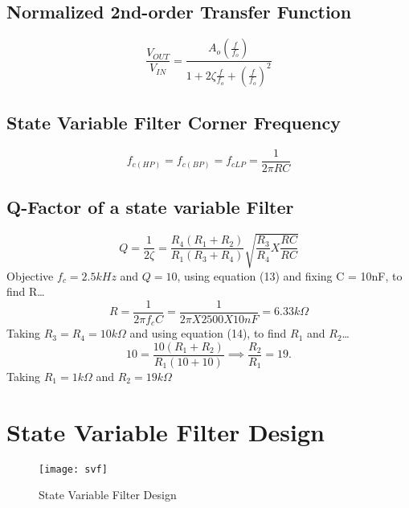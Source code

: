 \documentclass[
	letterpaper, %
	10pt, %
]{CSUniSchoolLabReport}
\begin{document}
\subsection{Normalized 2nd-order Transfer Function}
\begin{equation}
	\boxed{\frac{V_{OUT} }{V_{IN} } = \frac{A_o\left(\frac{f}{f_o}\right)}{1+2\zeta \frac{f}{f_o}+ \left(\frac{f}{f_o}\right)^2}}
\end{equation}
\subsection{State Variable Filter Corner Frequency}
\begin{equation}
	f_{c(HP)} = f_{c(BP)} = f_{c{LP}} = \frac{1}{2\pi RC}
\end{equation}
\subsection{Q-Factor of a state variable Filter}
 \begin{equation}
	Q = \frac{1}{2 \zeta} = \frac{R_4(R_1 + R_2)}{R_1(R_3 + R_4)}\sqrt{\frac{R_3}{R_4}X \frac{RC}{RC}} 
 \end{equation}
Objective $f_c = 2.5 kHz$ and $Q = 10$, 
using equation (13) and fixing C = 10nF, to find R\dots
\begin{equation}
	R = \frac{1}{2 \pi f_c C} = \frac{1}{2 \pi X 2500 X 10 nF}= 6.33 k\Omega
\end{equation}
Taking $R_3 = R_4 = 10 k\Omega$ and using equation (14), to find $R_1 $ and $R_2$\dots
\begin{equation}
	10 = \frac{10(R_1 + R_2)}{R_1(10 + 10)} \implies  \frac{R_2}{R_1} = 19. 
\end{equation}
Taking \(R_1 = 1 k\Omega\) and \(R_2 = 19 k\Omega\) 
\section{State Variable Filter Design}

\begin{figure}[H] %
	\centering %
	\texttt{[image: svf]} %
	\caption{State Variable Filter Design}
\end{figure}
\end{document}
